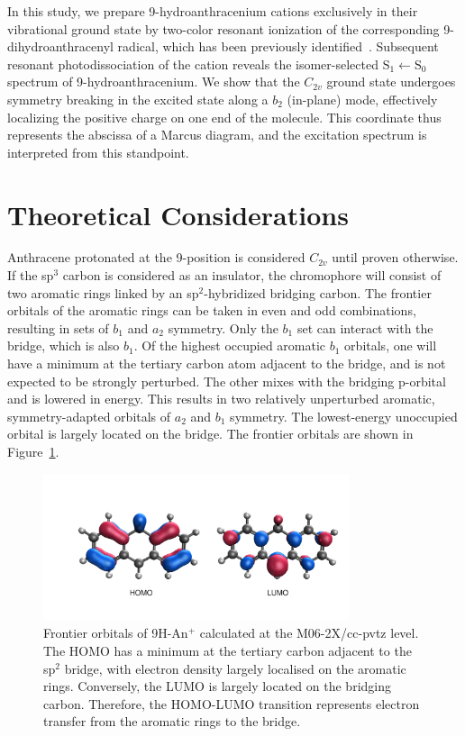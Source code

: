\documentclass[journal=jpcafh,manuscript=article,layout=onecolumn, 12pt]{achemso}
\begin{document}
In this study, we prepare 9-hydroanthracenium cations exclusively in their vibrational ground state by two-color resonant ionization of the corresponding 9-dihydroanthracenyl radical, which has been previously identified~\cite{kre19}. Subsequent resonant photodissociation of the cation reveals the isomer-selected $\text{S}_1\leftarrow\text{S}_0$ spectrum of 9-hydroanthracenium. We show that the $C_{2v}$ ground state undergoes symmetry breaking in the excited state along a $b_2$ (in-plane) mode, effectively localizing the positive charge on one end of the molecule. This coordinate thus represents the abscissa of a Marcus diagram, and the excitation spectrum is interpreted from this standpoint.

\section{Theoretical Considerations}
Anthracene protonated at the 9-position is considered $C_{2v}$ until proven otherwise. If the sp$^3$ carbon is considered as an insulator, the chromophore will consist of two aromatic rings linked by an sp$^2$-hybridized bridging carbon. The frontier orbitals of the aromatic rings can be taken in even and odd combinations, resulting in sets of $b_1$ and $a_2$ symmetry. Only the $b_1$ set can interact with the bridge, which is also $b_1$. Of the highest occupied aromatic $b_1$ orbitals, one will have a minimum at the tertiary carbon atom adjacent to the bridge, and is not expected to be strongly perturbed. The other mixes with the bridging p-orbital and is lowered in energy. This results in two relatively unperturbed aromatic, symmetry-adapted orbitals of $a_2$ and $b_1$ symmetry. The lowest-energy unoccupied orbital is largely located on the bridge. The frontier orbitals are shown in Figure~\ref{Fig:1}.

\begin{figure} [h]
	\includegraphics[width=0.8\textwidth]{figures/Figure1}
	\caption{Frontier orbitals of 9H-An$^+$ calculated at the M06-2X/cc-pvtz level. The HOMO has a minimum at the tertiary carbon adjacent to the sp$^2$ bridge, with electron density largely localised on the aromatic rings. Conversely, the LUMO is largely located on the bridging carbon. Therefore, the HOMO-LUMO transition represents electron transfer from the aromatic rings to the bridge.}
	\label{Fig:1}
\end{figure}
\end{document}
